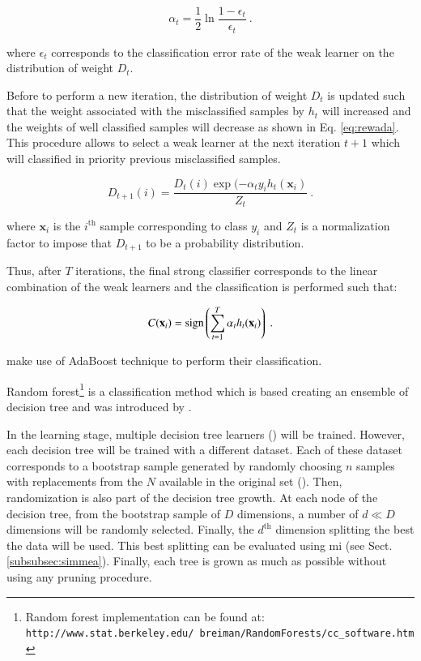 \begin{enumerate}[leftmargin=*]
\begin{equation}
	\alpha_t = \frac{1}{2} \ln \frac{1 - \epsilon_t}{\epsilon_t} \ .
	\label{eq:wclssada}
\end{equation}

\noindent where $\epsilon_t$ corresponds to the classification error rate of the weak learner on the distribution of weight $D_t$.

Before to perform a new iteration, the distribution of weight $D_t$ is updated such that the weight associated with the misclassified samples by $h_t$ will increased and the weights of well classified samples will decrease as shown in Eq. \ref{eq:rewada}. This procedure allows to select a weak learner at the next iteration $t+1$ which will classified in priority previous misclassified samples.

\begin{equation}
	D_{t+1}(i) = \frac{ D_t(i) \exp(-\alpha_t y_i h_{t}(\mathbf{x}_{i} ) }{ Z_t  } \ .
	\label{eq:rewada} 
\end{equation}

\noindent where $\mathbf{x}_i$ is the $i^{\text{th}}$ sample corresponding to class $y_i$ and $Z_t$ is a normalization factor to impose that $D_{t+1}$ to be a probability distribution.

Thus, after $T$ iterations, the final strong classifier corresponds to the linear combination of the weak learners and the classification is performed such that:

\begin{equation}
	C(\mathbf{x}_i) = \operatorname*{sign} \left( \sum_{t=1}^{T} \alpha_t h_t(\mathbf{x}_i) \right) \ .
	\label{eq:strclaada}
\end{equation}

\cite{Lopes2011} make use of AdaBoost technique to perform their classification.

Random forest\footnote{Random forest implementation can be found at: \texttt{http://www.stat.\allowbreak berkeley.edu/~breiman/RandomForests/cc\_software.htm}} is a classification method which is based creating an ensemble of decision tree and was introduced by \cite{Breiman2001}.

In the learning stage, multiple decision tree learners (\cite{Breiman1984}) will be trained. However, each decision tree will be trained with a different dataset. Each of these dataset corresponds to a bootstrap sample generated by randomly choosing $n$ samples with replacements from the $N$ available in the original set (\cite{Efron1979}). Then, randomization is also part of the decision tree growth. At each node of the decision tree, from the bootstrap sample of $D$ dimensions, a number of $d \ll D$ dimensions will be randomly selected. Finally, the $d^{\text{th}}$ dimension splitting the best the data will be used. This best splitting can be evaluated using \ac{mi} (see Sect. \ref{subsubsec:simmea}). Finally, each tree is grown as much as possible without using any pruning procedure.


\end{enumerate}
